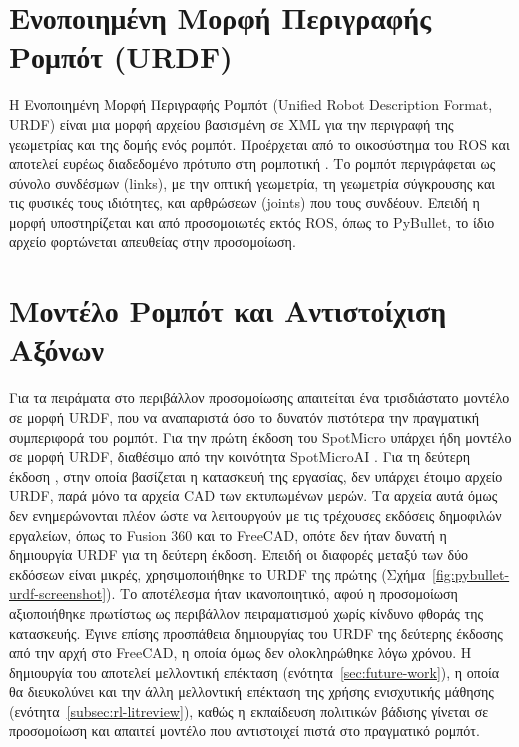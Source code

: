 \documentclass[11pt]{report}
\begin{document}
\section{Ενοποιημένη Μορφή Περιγραφής Ρομπότ (URDF)}
\label{sec:urdf}
Η Ενοποιημένη Μορφή Περιγραφής Ρομπότ (Unified Robot Description Format, URDF)
είναι μια μορφή αρχείου βασισμένη σε XML για την περιγραφή της γεωμετρίας και της
δομής ενός ρομπότ. Προέρχεται από το οικοσύστημα του ROS και αποτελεί ευρέως
διαδεδομένο πρότυπο στη ρομποτική \cite{ros2_urdf_jazzy}. Το ρομπότ περιγράφεται
ως σύνολο συνδέσμων (links), με την οπτική γεωμετρία, τη γεωμετρία σύγκρουσης και
τις φυσικές τους ιδιότητες, και αρθρώσεων (joints) που τους συνδέουν. Επειδή η
μορφή υποστηρίζεται και από προσομοιωτές εκτός ROS, όπως το PyBullet, το ίδιο
αρχείο φορτώνεται απευθείας στην προσομοίωση.

\section{Μοντέλο Ρομπότ και Αντιστοίχιση Αξόνων}
\label{sec:sim-model}
Για τα πειράματα στο περιβάλλον προσομοίωσης απαιτείται ένα τρισδιάστατο μοντέλο
σε μορφή URDF, που να αναπαριστά όσο το δυνατόν πιστότερα την πραγματική
συμπεριφορά του ρομπότ. Για την πρώτη έκδοση του SpotMicro
\cite{kim_spotmicro_2019} υπάρχει ήδη
μοντέλο σε μορφή URDF, διαθέσιμο από την κοινότητα SpotMicroAI
\cite{spotmicroai_project}. Για τη δεύτερη έκδοση \cite{taibo_spotmicro_2020},
στην οποία βασίζεται η κατασκευή της εργασίας, δεν υπάρχει έτοιμο αρχείο URDF,
παρά μόνο τα αρχεία CAD των εκτυπωμένων μερών. Τα αρχεία αυτά όμως δεν
ενημερώνονται πλέον ώστε να λειτουργούν με τις τρέχουσες εκδόσεις δημοφιλών
εργαλείων, όπως το Fusion 360 και το FreeCAD, οπότε δεν ήταν δυνατή η δημιουργία
URDF για τη δεύτερη έκδοση. Επειδή οι διαφορές μεταξύ των δύο εκδόσεων είναι
μικρές, χρησιμοποιήθηκε το URDF της πρώτης
(Σχήμα~\ref{fig:pybullet-urdf-screenshot}). Το αποτέλεσμα ήταν ικανοποιητικό,
αφού η προσομοίωση αξιοποιήθηκε πρωτίστως ως περιβάλλον πειραματισμού χωρίς
κίνδυνο φθοράς της κατασκευής. Έγινε επίσης προσπάθεια δημιουργίας του URDF της
δεύτερης έκδοσης από την αρχή στο FreeCAD, η οποία όμως δεν ολοκληρώθηκε λόγω
χρόνου. Η δημιουργία του αποτελεί μελλοντική επέκταση
(ενότητα~\ref{sec:future-work}), η οποία θα διευκολύνει και την άλλη μελλοντική
επέκταση της χρήσης ενισχυτικής μάθησης (ενότητα~\ref{subsec:rl-litreview}),
καθώς η εκπαίδευση πολιτικών βάδισης γίνεται σε προσομοίωση και απαιτεί μοντέλο
που αντιστοιχεί πιστά στο πραγματικό ρομπότ.
\end{document}
